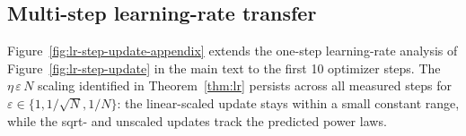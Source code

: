 

\subsection{Multi-step learning-rate transfer}
\label{app:lr-multistep}

Figure~\ref{fig:lr-step-update-appendix} extends the one-step learning-rate analysis of Figure~\ref{fig:lr-step-update} in the main text to the first 10 optimizer steps.
The $\eta\,\varepsilon\,N$ scaling identified in Theorem~\ref{thm:lr} persists across all measured steps for $\varepsilon\in\{1,1/\!\sqrt N,1/N\}$: the linear-scaled update stays within a small constant range, while the sqrt- and unscaled updates track the predicted power laws.


